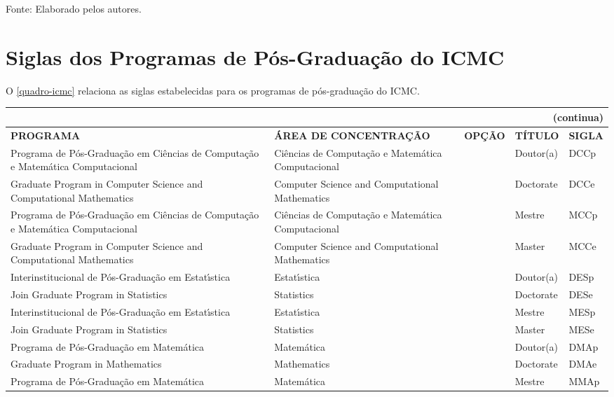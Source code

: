 \begin{apendicesenv}
\begin{quadro}[Htb]
\begin{tabular}{|p{3.5cm}|p{3.5cm}|p{3.5cm}|p{1.5cm}|p{2.25cm}|}
\end{tabular}
\begin{flushleft}
		Fonte: Elaborado pelos autores.\
\end{flushleft}
\end{quadro}

\chapter{Siglas dos Programas de P\'os-Gradua\c{c}\~ao do ICMC}
O \autoref{quadro-icmc} relaciona as siglas estabelecidas para os programas de p\'os-gradua\c{c}\~ao do ICMC.
\begin{quadro}[Htb]
\ABNTEXfontereduzida
\caption[Siglas dos Programas de P\'os-Gradua\c{c}\~ao do ICMC]{Siglas dos Programas de P\'os-Gradua\c{c}\~ao do ICMC}
\label{quadro-icmc}
\begin{tabular}{|p{3.5cm}|p{3.5cm}|p{2.5cm}|p{2.5cm}|p{2.25cm}|}
  \multicolumn{5}{r}{{(continua)}} \\ 
  \hline
   \textbf{PROGRAMA} & \textbf{\'AREA DE CONCENTRA\c{C}\~AO} & \textbf{OP\c{C}\~AO} & \textbf{T\'ITULO} & \textbf{SIGLA}  \\
    \hline 
		Programa de P\'os-Gradua\c{c}\~ao em Ci\^encias de Computa\c{c}\~ao e Matem\'atica Computacional & Ci\^encias de Computa\c{c}\~ao e Matem\'atica Computacional	&   &	Doutor(a)	 & DCCp\\
		Graduate Program in Computer Science and Computational Mathematics & Computer Science and Computational Mathematics	&   &	Doctorate & DCCe\\
	    Programa de P\'os-Gradua\c{c}\~ao em Ci\^encias de Computa\c{c}\~ao e Matem\'atica Computacional & Ci\^encias de Computa\c{c}\~ao e Matem\'atica Computacional	&   &	Mestre	& MCCp\\
	    Graduate Program in Computer Science and Computational Mathematics & Computer Science and Computational Mathematics &  & Master & MCCe\\
	    Interinstitucional de P\'os-Gradua\c{c}\~ao em Estat\'{\i}stica & Estat\'{\i}stica &  & Doutor(a)	 & DESp\\
		Join Graduate Program in Statistics & Statistics &  & Doctorate & 	DESe\\
		Interinstitucional de P\'os-Gradua\c{c}\~ao em Estat\'{\i}stica & Estat\'{\i}stica &  & Mestre & MESp\\
		Join Graduate Program in Statistics & Statistics &  & Master & MESe\\
		Programa de P\'os-Gradua\c{c}\~ao em Matem\'atica  & Matem\'atica &   &	Doutor(a) & DMAp\\
		Graduate Program in Mathematics & Mathematics &   & Doctorate & DMAe\\
		Programa de P\'os-Gradua\c{c}\~ao em Matem\'atica  & Matem\'atica &   &	Mestre & MMAp\\


\end{tabular}
\end{quadro}
\end{apendicesenv}
